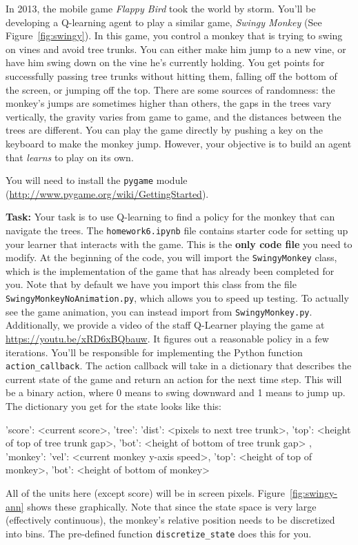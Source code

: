 \documentclass[submit]{harvardml}
\begin{document}
\begin{problem}
  In 2013, the mobile game \emph{Flappy Bird} took the world by storm. You'll be developing a Q-learning agent to play a similar game, \emph{Swingy Monkey} (See Figure~\ref{fig:swingy}).  In this game, you control a monkey that is trying to swing on vines and avoid tree trunks.  You can either make him jump to a new vine, or have him swing down on the vine he's currently holding.  You get points for successfully passing tree trunks without hitting them, falling off the bottom of the screen, or jumping off the top.  There are some sources of randomness: the monkey's jumps are sometimes higher than others, the gaps in the trees vary vertically, the gravity varies from game to game, and the distances between the trees are different.  You can play the game directly by pushing a key on the keyboard to make the monkey jump.  However, your objective is to build an agent that \emph{learns} to play on its own. 
  
   You will need to install the \verb|pygame| module
  (\url{http://www.pygame.org/wiki/GettingStarted}).
  

\textbf{Task:}
Your task is to use Q-learning to find a policy for the monkey that can navigate the trees.  The \verb|homework6.ipynb| file contains starter code for setting up your learner that interacts with the game. This is the \textbf{only code file} you need to modify. At the beginning of the code, you will import the \verb|SwingyMonkey| class, which is the implementation of the game that has already been completed for you. Note that by default we have you import this class from the file \verb|SwingyMonkeyNoAnimation.py|, which allows you to speed up testing. To actually see the game animation, you can instead import from \verb|SwingyMonkey.py|. Additionally, we provide a video of the staff Q-Learner playing the game at \url{https://youtu.be/xRD6xBQbauw}.  It figures out a reasonable policy in a few iterations.
You'll be responsible for implementing the Python function  \verb|action_callback|. The action callback will take in a dictionary that describes the current state of the game and return an action for the next time step.  This will be a binary action, where 0 means to swing downward and 1 means to jump up.  The dictionary you get for the state looks like this:
\begin{csv}
{ 'score': <current score>,
  'tree': { 'dist': <pixels to next tree trunk>,
            'top':  <height of top of tree trunk gap>,
            'bot':  <height of bottom of tree trunk gap> },
  'monkey': { 'vel': <current monkey y-axis speed>,
              'top': <height of top of monkey>,
              'bot': <height of bottom of monkey> }}
\end{csv}
All of the units here (except score) will be in screen pixels. Figure~\ref{fig:swingy-ann} shows these graphically. 
Note that since the state space is very large (effectively continuous), the monkey's relative position needs to be discretized into bins. The pre-defined function \verb|discretize_state| does this for you.


\end{problem}
\end{document}
